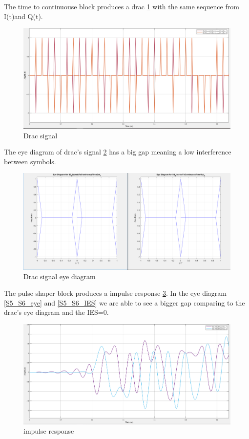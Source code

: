 The time to continuouse block produces a drac \ref{S3_S4} with the same sequence from I(t)and Q(t). 
\begin{figure}[H]
\centering
\includegraphics[scale=0.35]{./lib/m_qam_transmitter/figures/S3_S4.PNG}
\caption{Drac signal}\label{S3_S4}
\end{figure}
The eye diagram of drac's signal \ref{S3_S4_eye} has a big gap meaning a low interference between symbols.
\begin{figure}[H]
\centering
\includegraphics[scale=0.35]{./lib/m_qam_transmitter/figures/S3_S4_eye.PNG}
\caption{Drac signal eye diagram}\label{S3_S4_eye}
\end{figure}
The pulse shaper block produces a impulse response \ref{S5_S6}. In the eye diagram \ref{S5_S6_eye} and \ref{S5_S6_IES} we are able to see a bigger gap comparing to the drac's eye diagram and the IES=0.
\begin{figure}[H]
\centering
\includegraphics[scale=0.35]{./lib/m_qam_transmitter/figures/S5_S6.PNG}
\caption{impulse response}\label{S5_S6}
\end{figure}

